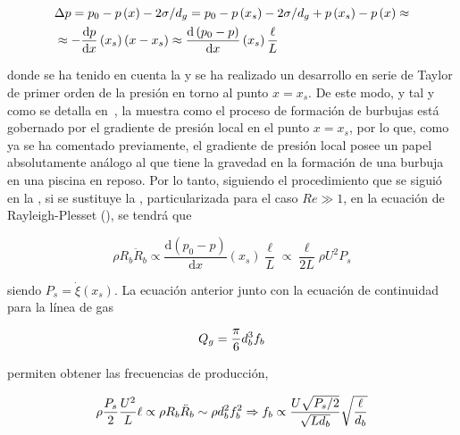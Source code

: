 \begin{equation}
\begin{split}
&\Delta p = p_{0} - p\left(x\right) - 2\sigma/d_{g} = p_{0} - p\left(x_{s}\right) - 2\sigma/d_{g} + p\left(x_{s}\right) - p\left(x\right) \approx \\
& \approx - \dfrac{\mathrm{d}p}{\mathrm{d} x}\left(x_{s}\right)\left(x-x_{s}\right) \approx \dfrac{\mathrm{d}\left(p_{0}-p\right)}{\mathrm{d}x}\left(x_{s}\right)\dfrac{\ell}{L}
\end{split}
\LABEQ{gradPress}
\end{equation}

donde se ha tenido en cuenta la  y se ha realizado un desarrollo en serie de Taylor de primer orden de la presión en torno al punto $x = x_{s}$. De este modo, y tal y como se detalla en~\cite{Evangelio2015b}, la  muestra como el proceso de formación de burbujas está gobernado por el gradiente de presión local en el punto $x = x_{s}$, por lo que, como ya se ha comentado previamente, el gradiente de presión local posee un papel absolutamente análogo al que tiene la gravedad en la formación de una burbuja en una piscina en reposo. Por lo tanto, siguiendo el procedimiento que se siguió en la , si se sustituye la , particularizada para el caso $Re \gg 1$, en la ecuación de Rayleigh-Plesset (), se tendrá que 

\begin{equation}
\rho R_{b}\ddot{R}_{b} \propto \dfrac{\mathrm{d}\left(p_{0} - p\right)}{\mathrm{d}x}\left(x_{s}\right)\dfrac{\ell}{L}\propto \dfrac{\ell}{2L}\rho U^{2} P_{s}
\end{equation}

siendo $P_{s} = \dot{\xi}\left(x_{s}\right)$. La ecuación anterior junto con la ecuación de continuidad para la línea de gas

\begin{equation}
Q_{g} = \dfrac{\pi}{6}d_{b}^{3} f_{b}
\LABEQ{Qgfreq}
\end{equation}

permiten obtener las frecuencias de producción,

\begin{equation}
\rho \dfrac{P_{s}}{2}\dfrac{U^{2}}{L}\ell \propto \rho R_{b} \ddot{R}_{b} \sim \rho d_{b}^{2}f_{b}^{2} \Rightarrow f_{b} \propto \dfrac{U\sqrt{P_{s}/2}}{\sqrt{L d_{b}}}\sqrt{\dfrac{\ell}{d_{b}}}
\LABEQ{freqGradPres}
\end{equation}

